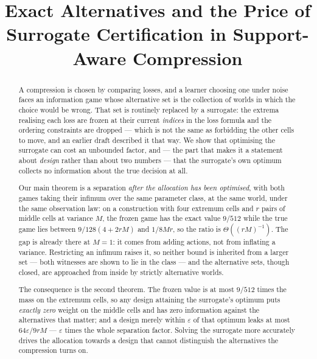 



\title{Exact Alternatives and the Price of\\Surrogate Certification
in Support-Aware Compression}

\author{
}

\maketitle

\begin{abstract}
A compression is chosen by comparing losses, and a learner choosing one under noise faces an
information game whose alternative set is the collection of worlds in which the choice would
be wrong. That set is routinely replaced by a surrogate: the extrema realising each loss are
frozen at their current \emph{indices} in the loss formula and the ordering constraints are
dropped --- which is not the same as forbidding the other cells to move, and an earlier
draft described it that way. We show that optimising the
surrogate can cost an unbounded factor, and --- the part that makes it a statement about
\emph{design} rather than about two numbers --- that the surrogate's own optimum collects no
information about the true decision at all.

Our main theorem is a separation \emph{after the allocation has been optimised}, with both
games taking their infimum over the same parameter class, at the same world, under the same
observation law: on a construction with four extremum cells and $r$ pairs of middle cells at
variance $M$, the frozen game has the exact value $9/512$ while the true game lies between
$9/128(4+2rM)$ and $1/8Mr$, so the ratio is $\Theta((rM)^{-1})$. The gap is already there at
$M=1$: it comes from adding actions, not from inflating a variance. Restricting an infimum
raises it, so neither bound is inherited from a larger set --- both witnesses are shown to
lie in the class --- and the alternative sets, though closed, are approached from inside by
strictly alternative worlds.

The consequence is the second theorem. The frozen value is at most $9/512$ times the mass on
the extremum cells, so any design attaining the surrogate's optimum puts \emph{exactly zero}
weight on the middle cells and has zero information against the alternatives that matter;
and a design merely within $\varepsilon$ of that optimum leaks at most $64\varepsilon/9rM$ ---
$\varepsilon$ times the whole separation factor. Solving the surrogate more accurately drives
the allocation towards a design that cannot distinguish the alternatives the compression
turns on.


\end{abstract}
